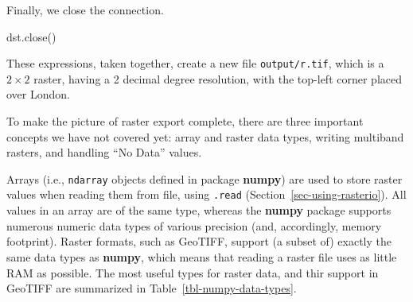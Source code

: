 \documentclass[
  letterpaper,
]{krantz}
\newenvironment{Shaded}{\begin{snugshade}}{\end{snugshade}}
\newcommand{\NormalTok}[1]{\textcolor[rgb]{0.00,0.23,0.31}{#1}}
\begin{document}
Finally, we close the connection.

\begin{Shaded}
\begin{Highlighting}[]
\NormalTok{dst.close()}
\end{Highlighting}
\end{Shaded}

These expressions, taken together, create a new file
\texttt{output/r.tif}, which is a \(2 \times 2\) raster, having a 2
decimal degree resolution, with the top-left corner placed over London.

To make the picture of raster export complete, there are three important
concepts we have not covered yet: array and raster data types, writing
multiband rasters, and handling ``No Data'' values.

Arrays (i.e., \texttt{ndarray} objects defined in package
\textbf{numpy}) are used to store raster values when reading them from
file, using \texttt{.read} (Section~\ref{sec-using-rasterio}). All
values in an array are of the same type, whereas the \textbf{numpy}
package supports numerous numeric data types of various precision (and,
accordingly, memory footprint). Raster formats, such as GeoTIFF, support
(a subset of) exactly the same data types as \textbf{numpy}, which means
that reading a raster file uses as little RAM as possible. The most
useful types for raster data, and thir support in GeoTIFF are summarized
in Table~\ref{tbl-numpy-data-types}.
\end{document}
